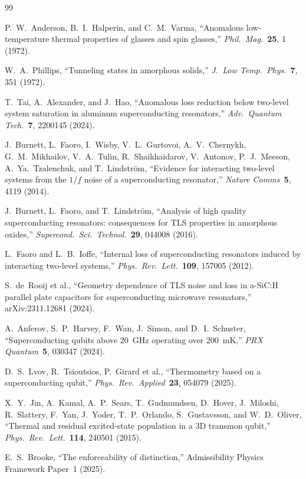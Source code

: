 \documentclass[11pt]{article}
\begin{document}
\begin{thebibliography}{99}

P.~W.~Anderson, B.~I.~Halperin, and C.~M.~Varma,
``Anomalous low-temperature thermal properties of glasses and spin glasses,''
\textit{Phil.\ Mag.}\ \textbf{25}, 1 (1972).

W.~A.~Phillips,
``Tunneling states in amorphous solids,''
\textit{J.\ Low Temp.\ Phys.}\ \textbf{7}, 351 (1972).

T.~Tai, A.~Alexander, and J.~Hao,
``Anomalous loss reduction below two-level system saturation in aluminum superconducting resonators,''
\textit{Adv.\ Quantum Tech.}\ \textbf{7}, 2200145 (2024).

J.~Burnett, L.~Faoro, I.~Wisby, V.~L.~Gurtovoi, A.~V.~Chernykh, G.~M.~Mikhailov, V.~A.~Tulin, R.~Shaikhaidarov, V.~Antonov, P.~J.~Meeson, A.~Ya.~Tzalenchuk, and T.~Lindstr\"om,
``Evidence for interacting two-level systems from the $1/f$ noise of a superconducting resonator,''
\textit{Nature Comms}\ \textbf{5}, 4119 (2014).

J.~Burnett, L.~Faoro, and T.~Lindstr\"om,
``Analysis of high quality superconducting resonators: consequences for TLS properties in amorphous oxides,''
\textit{Supercond.\ Sci.\ Technol.}\ \textbf{29}, 044008 (2016).

L.~Faoro and L.~B.~Ioffe,
``Internal loss of superconducting resonators induced by interacting two-level systems,''
\textit{Phys.\ Rev.\ Lett.}\ \textbf{109}, 157005 (2012).

S.~de~Rooij et al.,
``Geometry dependence of TLS noise and loss in a-SiC:H parallel plate capacitors for superconducting microwave resonators,''
arXiv:2311.12681 (2024).

A.~Anferov, S.~P.~Harvey, F.~Wan, J.~Simon, and D.~I.~Schuster,
``Superconducting qubits above 20~GHz operating over 200~mK,''
\textit{PRX Quantum}\ \textbf{5}, 030347 (2024).

D.~S.~Lvov, R.~Tsioutsios, P.~Girard et al.,
``Thermometry based on a superconducting qubit,''
\textit{Phys.\ Rev.\ Applied}\ \textbf{23}, 054079 (2025).

X.~Y.~Jin, A.~Kamal, A.~P.~Sears, T.~Gudmundsen, D.~Hover, J.~Miloshi, R.~Slattery, F.~Yan, J.~Yoder, T.~P.~Orlando, S.~Gustavsson, and W.~D.~Oliver,
``Thermal and residual excited-state population in a 3D transmon qubit,''
\textit{Phys.\ Rev.\ Lett.}\ \textbf{114}, 240501 (2015).

E.~S.~Brooke,
``The enforceability of distinction,''
Admissibility Physics Framework Paper~1 (2025).

\end{thebibliography}
\end{document}
